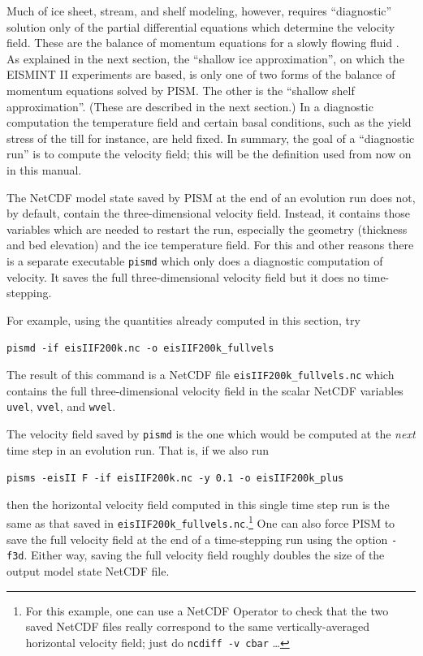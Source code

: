 \documentclass[11pt,final]{amsart}
\renewcommand{\t}[1]{\texttt{#1}}
\begin{document}
Much of ice sheet, stream, and shelf modeling, however, requires ``diagnostic'' solution only of the partial differential equations which determine the velocity field.  These are the balance of momentum equations for a slowly flowing fluid \cite{Fowler}.  As explained in the next section, the ``shallow ice approximation'', on which the EISMINT II experiments are based, is only one of two forms of the balance of momentum equations solved by PISM.  The other is the ``shallow shelf approximation''.  (These are described in the next section.)  In a diagnostic computation the temperature field and certain basal conditions, such as the yield stress of the till for instance, are held fixed.  In summary, the goal of a ``diagnostic run'' is to compute the velocity field; this will be the definition used from now on in this manual.

The NetCDF model state saved by PISM at the end of an evolution run does not, by default, contain the three-dimensional velocity field.  Instead, it contains those variables which are needed to restart the run, especially the geometry (thickness and bed elevation) and the ice temperature field.  For this and other reasons there is a separate executable \verb|pismd| which only does a diagnostic computation of velocity.  It saves the full three-dimensional velocity field but it does no time-stepping.

For example, using the quantities already computed in this section, try

\verb|pismd -if eisIIF200k.nc -o eisIIF200k_fullvels|

\noindent The result of this command is a NetCDF file \verb|eisIIF200k_fullvels.nc| which contains the full three-dimensional velocity field in the scalar NetCDF variables \verb|uvel|, \verb|vvel|, and \verb|wvel|.

The velocity field saved by \verb|pismd| is the one which would be computed at the \emph{next} time step in an evolution run.  That is, if we also run

\verb|pisms -eisII F -if eisIIF200k.nc -y 0.1 -o eisIIF200k_plus|

\noindent then the horizontal velocity field computed in this single time step run is the same as that saved in \verb|eisIIF200k_fullvels.nc|.\footnote{For this example, one can use a NetCDF Operator to check that the two saved NetCDF files really correspond to the same vertically-averaged horizontal velocity field; just do \t{ncdiff -v cbar} \dots}  One can also force PISM to save the full velocity field at the end of a time-stepping run using the option \verb|-f3d|.  Either way, saving the full velocity field roughly doubles the size of the output model state NetCDF file.
\end{document}
